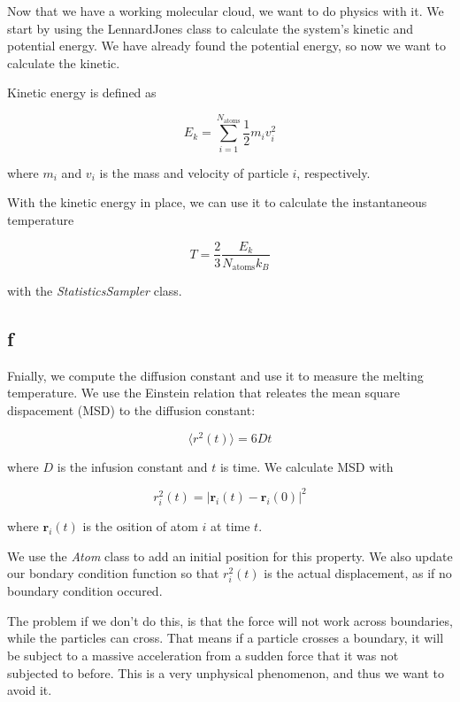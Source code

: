 \documentclass[10pt,showpacs,preprintnumbers,footinbib,amsmath,amssymb,aps,prl,twocolumn,groupedaddress,superscriptaddress,showkeys]{revtex4-1}
\newcommand{\suml}[2]{\sum\limits_{#1}^{#2}}
\begin{document}
Now that we have a working molecular cloud, we want to do physics with it. We start by using the LennardJones class to calculate the system's kinetic and potential energy. We have already found the potential energy, so now we want to calculate the kinetic.

Kinetic energy is defined as

\begin{equation}
E_k = \suml{i = 1}{N_\mathrm{atoms}}\frac{1}{2}m_i v_i^2
\end{equation}

where $m_i$ and $v_i$ is the mass and velocity of particle $i$, respectively.

With the kinetic energy in place, we can use it to calculate the instantaneous temperature

\begin{equation}
T = \frac{2}{3}\frac{E_k}{N_\mathrm{atoms}k_B}
\end{equation}

with the \textit{StatisticsSampler} class.

\subsection*{f}

Fnially, we compute the diffusion constant and use it to measure the melting temperature. We use the Einstein relation that releates the mean square dispacement (MSD) to the diffusion constant:

\begin{equation}
\langle r^2(t) \rangle = 6Dt
\end{equation}

where $D$ is the infusion constant and $t$ is time. We calculate MSD with 

\begin{equation}
r_i^2(t) = | \textbf{r}_i (t) - \textbf{r}_i (0) |^2
\end{equation}

where $\textbf{r}_i (t)$ is the osition of atom $i$ at time $t$.

We use the \textit{Atom} class to add an initial position for this property. We also update our bondary condition function so that $r_i^2(t)$ is the actual displacement, as if no boundary condition occured.

The problem if we don't do this, is that the force will not work across boundaries, while the particles can cross. That means if a particle crosses a boundary, it will be subject to a massive acceleration from a sudden force that it was not subjected to before. This is a very unphysical phenomenon, and thus we want to avoid it.
\end{document}
